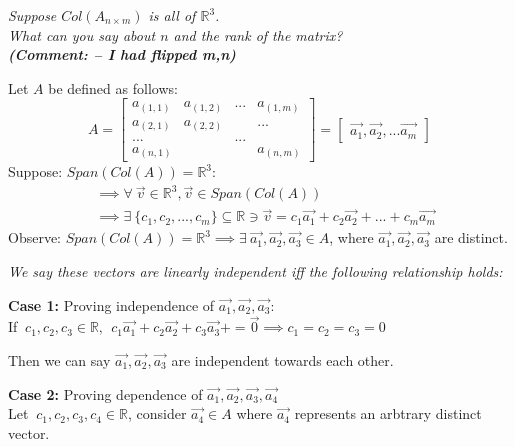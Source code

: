 \documentclass[11pt]{article}
\theoremstyle{plain}
\begin{document}
\begin{center}
	\textit{Suppose $Col(A_{n \times m})$ is all of $\mathbb{R}^3$. \\
		What can you say about $n$ and the rank of the matrix?} \\
	\textit{\textbf{(Comment: -- I had flipped m,n)} }
\end{center}
Let $A$ be defined as follows:
\[
	A =
	\begin{bmatrix}
		a_{(1,1)} & a_{(1,2)} & ... & a_{(1,m)} \\
		a_{(2,1)} & a_{(2,2)} &     & ...       \\
		...       &           & ... &           \\
		a_{(n,1)} &           &     & a_{(n,m)}
	\end{bmatrix}
	= \begin{bmatrix}
		\vec{a_1}, \vec{a_2}, ... \vec{a_m}
	\end{bmatrix}
\]
Suppose: $Span(Col(A)) = \mathbb{R}^3$:
\[
	\begin{aligned}
		 & \implies \forall ~\vec{v} \in \mathbb{R}^3, \vec{v} \in Span(Col(A))                                                           \\
		 & \implies \exists ~\{ c_1,c_2,...,c_m \} \subseteq \mathbb{R} \ni \vec{v} = c_1 \vec{a_1} + c_2 \vec{a_2} + ... + c_m \vec{a_m}
	\end{aligned}
\]
Observe: $Span(Col(A))=\mathbb{R}^3 \implies \exists ~\vec{a_1}, \vec{a_2}, \vec{a_3} \in A$, where $\vec{a_1}, \vec{a_2}, \vec{a_3}$ are distinct.\\
\begin{center}
	\textit{We say these vectors are linearly independent iff the following relationship holds:}\\
\end{center}
\textbf{Case 1: } Proving independence of $\vec{a_1}, \vec{a_2}, \vec{a_3}$: \\
If $~c_1,c_2,c_3 \in \mathbb{R}, ~~c_1\vec{a_1} + c_2\vec{a_2} + c_3\vec{a_3} + = \vec{0} \implies c_1 = c_2 = c_3 = 0$
\begin{center}
	Then we can say $\vec{a_1}, \vec{a_2}, \vec{a_3}$ are independent towards each other.
\end{center}
\textbf{Case 2: } Proving dependence of $\vec{a_1}, \vec{a_2}, \vec{a_3}, \vec{a_4}$\\
Let $~c_1,c_2,c_3,c_4 \in \mathbb{R}$, consider $\vec{a_4} \in A$ where $\vec{a_4}$ represents an arbtrary distinct vector. \\
\end{document}

